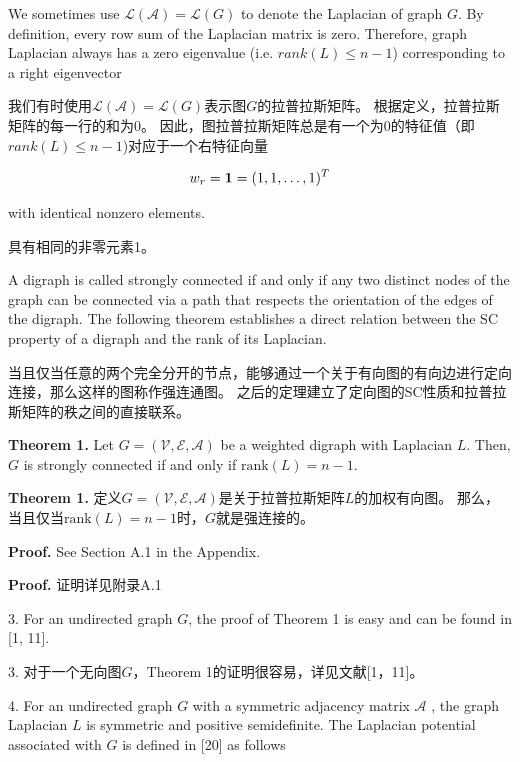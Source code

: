 \documentclass{article}
\begin{document}
{\color[gray]{0.5}
We sometimes use $\mathcal{L}(\mathcal{A}) = \mathcal{L}(G)$ to denote the Laplacian of graph $G$. 
By deﬁnition, every row sum of the Laplacian matrix is zero. 
Therefore, graph Laplacian always has a zero eigenvalue (i.e. $rank(L)\le n-1$) corresponding to a right eigenvector
}

我们有时使用$\mathcal{L}(\mathcal{A}) = \mathcal{L}(G)$表示图$G$的拉普拉斯矩阵。
根据定义，拉普拉斯矩阵的每一行的和为0。
因此，图拉普拉斯矩阵总是有一个为0的特征值（即$rank(L)\le n-1$)对应于一个右特征向量

\begin{equation}
    w_r = \mathbf{1} = (1,1,\dots,1)^T \notag
\end{equation}

{\color[gray]{0.5}
\noindent with identical nonzero elements.
}

\noindent 具有相同的非零元素1。

{\color[gray]{0.5}
A digraph is called strongly connected if and only if any two distinct nodes of the graph can be connected via a path that respects the orientation of the edges of the digraph. 
The following theorem establishes a direct relation between the SC property of a digraph and the rank of its Laplacian.
}

当且仅当任意的两个完全分开的节点，能够通过一个关于有向图的有向边进行定向连接，那么这样的图称作强连通图。
之后的定理建立了定向图的SC性质和拉普拉斯矩阵的秩之间的直接联系。

{\color[gray]{0.5}
\noindent \textbf{Theorem 1.} Let $G=(\mathcal{V},\mathcal{E},\mathcal{A})$ be a weighted digraph with Laplacian $L$. 
Then, $G$ is strongly connected if and only if $\text{rank}(L)=n-1$.
}

\noindent \textbf{Theorem 1.} 定义$G=(\mathcal{V},\mathcal{E},\mathcal{A})$是关于拉普拉斯矩阵$L$的加权有向图。
那么，当且仅当$\text{rank}(L)=n-1$时，$G$就是强连接的。

{\color[gray]{0.5}
\noindent \textbf{Proof.} See Section A.1 in the Appendix.
}

\noindent \textbf{Proof.} 证明详见附录A.1

{\color[gray]{0.5}
 3. For an undirected graph $G$, the proof of Theorem 1 is easy and can be found in [1, 11].
}

 3. 对于一个无向图$G$，Theorem 1的证明很容易，详见文献[1，11]。

{\color[gray]{0.5}
 4. For an undirected graph $G$ with a symmetric adjacency matrix $\mathcal{A}$ , the graph Laplacian $L$ is symmetric and positive semideﬁnite. 
The Laplacian potential associated with $G$ is deﬁned in [20] as follows
}
\end{document}
